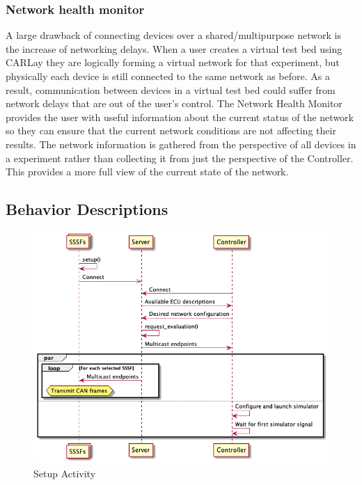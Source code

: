 \documentclass[letterpaper,twocolumn,12pt]{article}
\begin{document}
\subsubsection{Network health monitor}
A large drawback of connecting devices over a shared/multipurpose network is the increase of networking delays. When a user creates a virtual test bed using CARLay they are logically forming a virtual network for that experiment, but physically each device is still connected to the same network as before. As a result, communication between devices in a virtual test bed could suffer from network delays that are out of the user’s control. The Network Health Monitor provides the user with useful information about the current status of the network so they can ensure that the current network conditions are not affecting their results. The network information is gathered from the perspective of all devices in a experiment rather than collecting it from just the perspective of the Controller. This provides a more full view of the current state of the network.

\subsection{Behavior Descriptions}

\begin{figure}[t!]
    \centering
    \includegraphics[width=\linewidth]{out/images/connection_setup/connection_setup.png}
    \caption{Setup Activity}
    \label{fig:setup_activity}
\end{figure}
\end{document}
